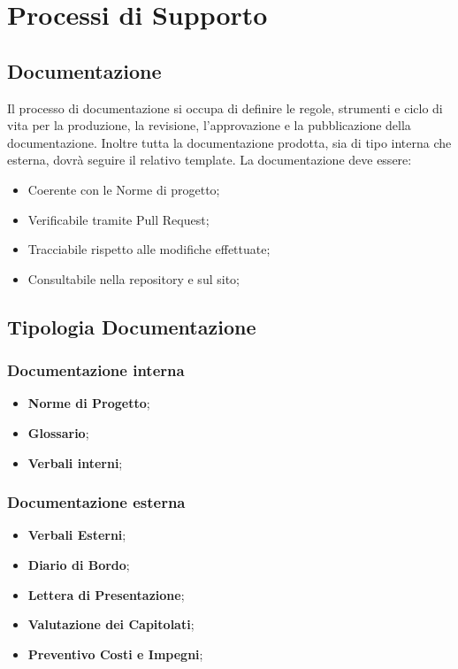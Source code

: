 \section{Processi di Supporto}
\subsection{Documentazione}
Il processo di documentazione si occupa di definire le regole, strumenti e ciclo di vita per la produzione, la revisione, l'approvazione e la pubblicazione della documentazione. Inoltre tutta la documentazione prodotta, sia di tipo interna che esterna, dovrà seguire il relativo template.
La documentazione deve essere:
\begin{itemize}
	\item Coerente con le Norme di progetto;
	\item Verificabile tramite Pull Request;
	\item Tracciabile rispetto alle modifiche effettuate;
	\item Consultabile nella repository e sul sito;
\end{itemize}
\subsection{Tipologia Documentazione}
\subsubsection{Documentazione interna}
\begin{itemize}
	\item \textbf{Norme di Progetto};
	\item \textbf{Glossario};
	\item \textbf{Verbali interni};
\end{itemize}

\subsubsection{Documentazione esterna}
\begin{itemize}
	\item \textbf{Verbali Esterni};
	\item \textbf{Diario di Bordo};
	\item \textbf{Lettera di Presentazione};
	\item \textbf{Valutazione dei Capitolati};
	\item \textbf{Preventivo Costi e Impegni};
\end{itemize}

